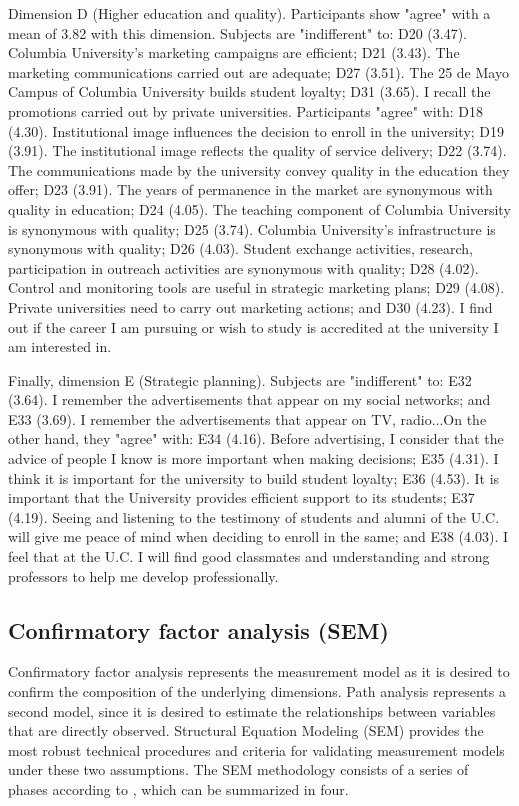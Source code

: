 \documentclass[english]{textolivre}
\begin{document}
Dimension D (Higher education and quality). Participants show "agree" with a mean of 3.82 with this dimension. Subjects are "indifferent" to: D20 (3.47). Columbia University's marketing campaigns are efficient; D21 (3.43). The marketing communications carried out are adequate; D27 (3.51). The 25 de Mayo Campus of Columbia University builds student loyalty; D31 (3.65). I recall the promotions carried out by private universities. Participants "agree" with: D18 (4.30). Institutional image influences the decision to enroll in the university; D19 (3.91). The institutional image reflects the quality of service delivery; D22 (3.74). The communications made by the university convey quality in the education they offer; D23 (3.91). The years of permanence in the market are synonymous with quality in education; D24 (4.05). The teaching component of Columbia University is synonymous with quality; D25 (3.74). Columbia University's infrastructure is synonymous with quality; D26 (4.03). Student exchange activities, research, participation in outreach activities are synonymous with quality; D28 (4.02). Control and monitoring tools are useful in strategic marketing plans; D29 (4.08). Private universities need to carry out marketing actions; and D30 (4.23). I find out if the career I am pursuing or wish to study is accredited at the university I am interested in.

Finally, dimension E (Strategic planning). Subjects are "indifferent" to: E32 (3.64). I remember the advertisements that appear on my social networks; and E33 (3.69). I remember the advertisements that appear on TV, radio...On the other hand, they "agree" with: E34 (4.16). Before advertising, I consider that the advice of people I know is more important when making decisions; E35 (4.31). I think it is important for the university to build student loyalty; E36 (4.53). It is important that the University provides efficient support to its students; E37 (4.19). Seeing and listening to the testimony of students and alumni of the U.C. will give me peace of mind when deciding to enroll in the same; and E38 (4.03). I feel that at the U.C. I will find good classmates and understanding and strong professors to help me develop professionally.

\subsection{Confirmatory factor analysis (SEM)}

Confirmatory factor analysis represents the measurement model as it is desired to confirm the composition of the underlying dimensions. Path analysis represents a second model, since it is desired to estimate the relationships between variables that are directly observed. Structural Equation Modeling (SEM) provides the most robust technical procedures and criteria for validating measurement models under these two assumptions. The SEM methodology consists of a series of phases according to \textcite{kaplan_structural_2000,kline_principles_2005}, which can be summarized in four.
\end{document}
